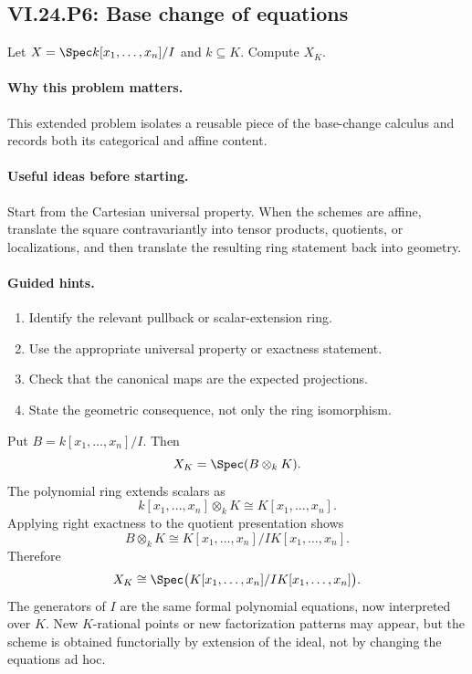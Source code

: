 \subsection*{VI.24.P6: Base change of equations}
\begin{problem}\label{prob:vi24-p06}
Let $X=\Spec k[x_1,\dots,x_n]/I$ and $k\subseteq K$. Compute $X_K$.
\end{problem}

\ifdefined\FullProblemDossiers
\paragraph{Why this problem matters.}
This extended problem isolates a reusable piece of the base-change calculus and records both its categorical and affine content.

\paragraph{Useful ideas before starting.}
Start from the Cartesian universal property.  When the schemes are affine, translate the square contravariantly into tensor products, quotients, or localizations, and then translate the resulting ring statement back into geometry.

\paragraph{Guided hints.}
\begin{enumerate}
\item Identify the relevant pullback or scalar-extension ring.
\item Use the appropriate universal property or exactness statement.
\item Check that the canonical maps are the expected projections.
\item State the geometric consequence, not only the ring isomorphism.
\end{enumerate}

\begin{solution}
Put $B=k[x_1,\dots,x_n]/I$.  Then
\[
X_K=\Spec(B\otimes_kK).
\]
The polynomial ring extends scalars as
\[
k[x_1,\dots,x_n]\otimes_kK\cong K[x_1,\dots,x_n].
\]
Applying right exactness to the quotient presentation shows
\[
B\otimes_kK\cong K[x_1,\dots,x_n]/IK[x_1,\dots,x_n].
\]
Therefore
\[
X_K\cong\Spec\bigl(K[x_1,\dots,x_n]/IK[x_1,\dots,x_n]\bigr).
\]
The generators of $I$ are the same formal polynomial equations, now interpreted over $K$.  New $K$-rational points or new factorization patterns may appear, but the scheme is obtained functorially by extension of the ideal, not by changing the equations ad hoc.
\end{solution}

